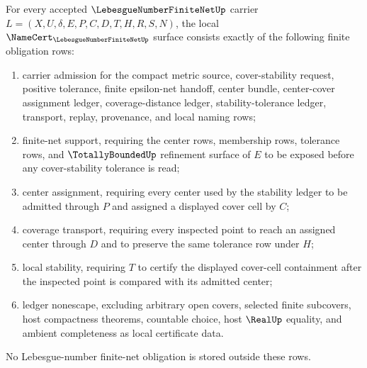 \begin{theorem}
\label{thm:lebesgue-number-finite-net-namecert-obligations}
For every accepted $\LebesgueNumberFiniteNetUp$ carrier $L=(X,U,\delta,E,P,C,D,T,H,R,S,N)$, the local $\NameCert_{\LebesgueNumberFiniteNetUp}$ surface consists exactly of the following finite obligation rows:
\begin{enumerate}
\item carrier admission for the compact metric source, cover-stability request, positive tolerance, finite epsilon-net handoff, center bundle, center-cover assignment ledger, coverage-distance ledger, stability-tolerance ledger, transport, replay, provenance, and local naming rows;
\item finite-net support, requiring the center rows, membership rows, tolerance rows, and $\TotallyBoundedUp$ refinement surface of $E$ to be exposed before any cover-stability tolerance is read;
\item center assignment, requiring every center used by the stability ledger to be admitted through $P$ and assigned a displayed cover cell by $C$;
\item coverage transport, requiring every inspected point to reach an assigned center through $D$ and to preserve the same tolerance row under $H$;
\item local stability, requiring $T$ to certify the displayed cover-cell containment after the inspected point is compared with its admitted center;
\item ledger nonescape, excluding arbitrary open covers, selected finite subcovers, host compactness theorems, countable choice, host $\RealUp$ equality, and ambient completeness as local certificate data.
\end{enumerate}
No Lebesgue-number finite-net obligation is stored outside these rows.
\end{theorem}
